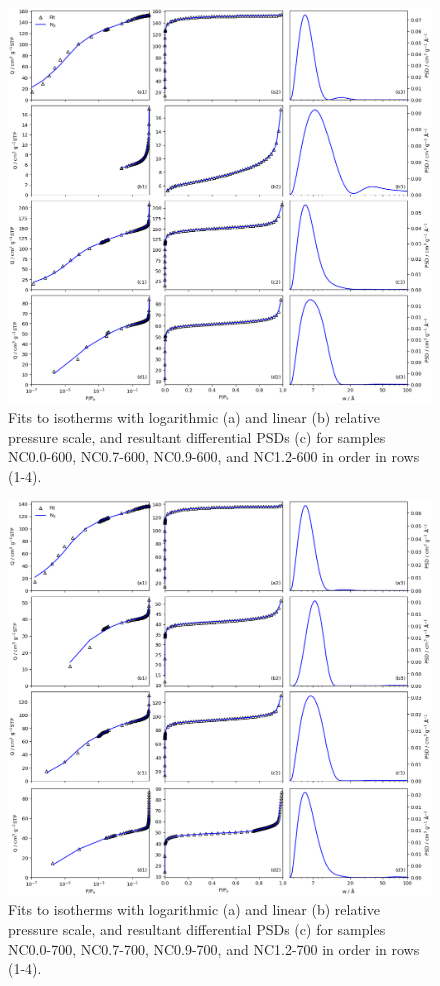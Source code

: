 \begin{subappendices}
\begin{figure}[p]
    \centering
    \includegraphics[width=\columnwidth, keepaspectratio]{4-impregnation/figs/NCxx-600_isopsd.png}
    \caption{Fits to  isotherms with logarithmic (a) and linear (b) relative pressure scale, and resultant differential PSDs (c) for samples NC0.0-600, NC0.7-600, NC0.9-600, and NC1.2-600 in order in rows (1-4).}
    \label{fig:NCxx-600_psdisofull}
\end{figure}

\begin{figure}[p]
    \centering
    \includegraphics[width=\columnwidth, keepaspectratio]{4-impregnation/figs/NCxx-700_isopsd.png}
    \caption{Fits to  isotherms with logarithmic (a) and linear (b) relative pressure scale, and resultant differential PSDs (c) for samples NC0.0-700, NC0.7-700, NC0.9-700, and NC1.2-700 in order in rows (1-4).}
    \label{fig:NCxx-700_psdisofull}
\end{figure}


\end{subappendices}
